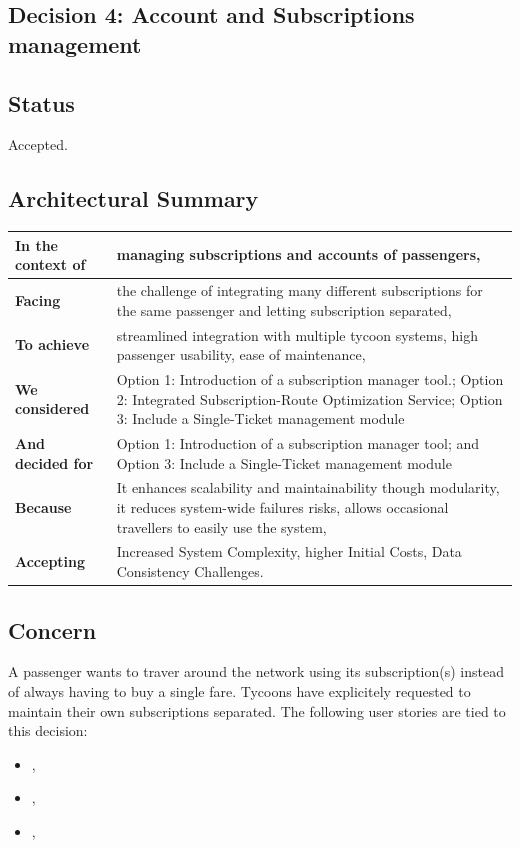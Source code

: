 \subsection{Decision 4: Account and Subscriptions management}

\subsection*{Status}
Accepted.

\subsection*{Architectural Summary}
\begin{tabular}{|p{3.5cm}|p{10.5cm}|}
    \hline
    \textbf{In the context of} & managing subscriptions and accounts of passengers, \\
    \hline
    \textbf{Facing} & the challenge of integrating many different subscriptions for the same passenger and letting subscription separated, \\
    \hline
    \textbf{To achieve} & streamlined integration with multiple tycoon systems, high passenger usability, ease of maintenance, \\
    \hline
    \textbf{We considered} & Option 1: Introduction of a subscription manager tool.; Option 2: Integrated Subscription-Route Optimization Service; Option 3: Include a Single-Ticket management module\\
    \hline
    \textbf{And decided for} & Option 1: Introduction of a subscription manager tool; and Option 3: Include a Single-Ticket management module  \\
    \hline
    \textbf{Because} & It enhances scalability and maintainability though modularity, it reduces system-wide failures risks, allows occasional travellers to easily use the system, \\
    \hline
    \textbf{Accepting} & Increased System Complexity, higher Initial Costs, Data Consistency Challenges. \\
    \hline
\end{tabular}

\subsection*{Concern}
A passenger wants to traver around the network using its subscription(s) instead of always having to buy a single fare.
Tycoons have explicitely requested to maintain their own subscriptions separated.
The following user stories are tied to this decision:
\begin{itemize}
    \item \userStorySixteen,
    \item \userStoryTwentyThree,
    \item \userStoryThirty,
\end{itemize}

